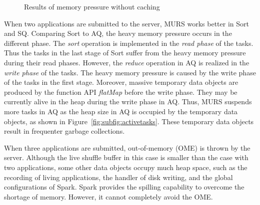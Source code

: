 \begin{figure*}[!t]
\centering
{}
\vspace*{-2mm}
\caption{Results of memory pressure without caching}
\vspace*{-4mm}
\label{fig:pressurewithoutcache}
\end{figure*}

When two applications are submitted to the server, MURS works better in Sort and SQ. Comparing Sort to AQ, the heavy memory pressure occurs in the different phase. The \textit{sort} operation is implemented in the \textit{read phase} of the tasks. Thus the tasks in the last stage of Sort suffer from the heavy memory pressure during their read phases. However, the \textit{reduce} operation in AQ is realized in the \textit{write phase} of the tasks. The heavy memory pressure is caused by the write phase of the tasks in the first stage. Moreover, massive temporary data objects are produced by the function API \textit{flatMap} before the write phase. They may be currently alive in the heap during the write phase in AQ. 
Thus, MURS suspends more tasks in AQ as the heap size in AQ is occupied by the temporary data objects, as shown in Figure~\ref{fig:subfig:activetasks}. These temporary data objects result in frequenter garbage collections. 

When three applications are submitted, out-of-memory (OME) is thrown by the server. Although the live shuffle buffer in this case is smaller than the case with two applications, some other data objects occupy much heap space, such as the recording of living applications, the handler of disk writing, and the global configurations of Spark. Spark provides the spilling capability to overcome the shortage of memory. However, it cannot completely avoid the OME.

